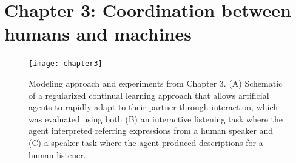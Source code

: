 \documentclass[11pt]{article}
\begin{document}

\section*{Chapter 3: Coordination between humans and machines}

\begin{figure}[t]
\centering
\texttt{[image: chapter3]}
\caption{\small Modeling approach and experiments from Chapter 3. (A) Schematic of a regularized continual learning approach that allows artificial agents to rapidly adapt to their partner through interaction, which was evaluated using both (B) an interactive listening task where the agent interpreted referring expressions from a human speaker and (C) a speaker task where the agent produced descriptions for a human listener.}
\label{fig:chapter3}
\end{figure}
\end{document}
